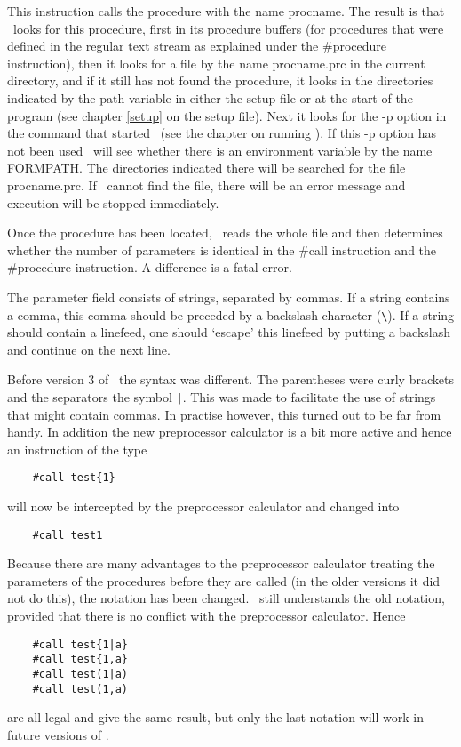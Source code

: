 \noindent This instruction calls the 
procedure with the name procname. The result is that \FORM\ 
looks for this procedure, first in its procedure 
buffers (for procedures that were defined in the 
regular text stream as explained under the \#procedure\index{\#procedure} 
instruction), then it looks for a file by the name procname.prc in the 
current directory, and if it still has not found the procedure, it looks in 
the directories indicated by the path\index{path} variable in either the setup 
file or at the start of the program (see chapter \ref{setup} on the setup 
file). Next it looks for the -p option in the command that started \FORM\ 
(see the chapter on running \FORM). If this -p option has not been used \FORM\ 
will see whether there is an environment variable by the name 
FORMPATH\index{FORMPATH}. The directories indicated there will be searched 
for the file procname.prc. If \FORM\ cannot find the file, there will be an 
error message and execution will be stopped immediately.

Once the procedure has been located, \FORM\ reads the whole file and then 
determines whether the number of parameters is identical in the 
\#call instruction and the \#procedure 
instruction. A difference is a fatal error.

The parameter field consists of strings, separated by commas. If a string 
contains a comma, this comma should be preceded by a 
backslash character (\verb:\:). If a string should contain 
a linefeed\index{linefeed}, one should `escape' this linefeed by putting a 
backslash and continue on the next line.

Before version 3 of \FORM\ the syntax was different. The parentheses 
were curly brackets and the separators the symbol \verb:|:. This was made 
to facilitate the use of strings that might contain commas. In practise 
however, this turned out to be far from handy. In addition the new 
preprocessor calculator is a bit more active and hence an instruction of 
the type
\begin{verbatim}
    #call test{1}
\end{verbatim}
will now be intercepted by the preprocessor calculator 
and changed into
\begin{verbatim}
    #call test1
\end{verbatim}
Because there are many advantages to the preprocessor calculator treating 
the parameters of the procedures before they are called (in the older 
versions it did not do this), the notation has been changed. \FORM\ still 
understands the old notation, provided that there is no conflict with the 
preprocessor calculator. Hence
\begin{verbatim}
    #call test{1|a}
    #call test{1,a}
    #call test(1|a)
    #call test(1,a)
\end{verbatim}
are all legal and give the same result, but only the last notation will 
work in future versions of \FORM.

